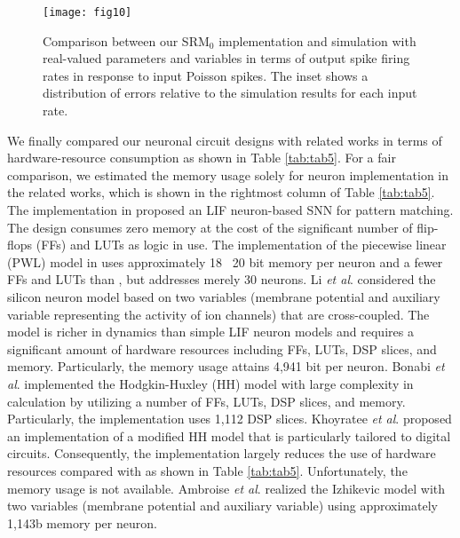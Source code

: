 \documentclass[10pt,journal]{IEEEtran}
\begin{document}
\begin{figure}[!b]\centering
    \texttt{[image: fig10]}
    \caption{\label{fig:fig10} Comparison between our SRM$_\textrm{0}$ implementation and simulation with real-valued parameters and variables in terms of output spike firing rates in response to input Poisson spikes. The inset shows a distribution of errors relative to the simulation results for each input rate.}
\end{figure}

We finally compared our neuronal circuit designs with related works in terms of hardware-resource consumption as shown in Table \ref{tab:tab5}. 
For a fair comparison, we estimated the memory usage solely for neuron implementation in the related works, which is shown in the rightmost column of Table \ref{tab:tab5}.
The implementation in \cite{caron2011fpga} proposed an LIF neuron-based SNN for pattern matching. 
The design consumes zero memory at the cost of the significant number of flip-flops (FFs) and LUTs as logic in use.
The implementation of the piecewise linear (PWL) model in \cite{soleimani2012biologically} uses approximately 18 \textendash~20 bit memory per neuron and a fewer FFs and LUTs than \cite{caron2011fpga}, but addresses merely 30 neurons.
Li \textit{et al}. \cite{li2012fpga} considered the silicon neuron model based on two variables (membrane potential and auxiliary variable representing the activity of ion channels) that are cross-coupled. 
The model is richer in dynamics than simple LIF neuron models and requires a significant amount of hardware resources including FFs, LUTs, DSP slices, and memory. 
Particularly, the memory usage attains 4,941 bit per neuron. 
Bonabi \textit{et al}. \cite{bonabi2014fpga} implemented the Hodgkin-Huxley (HH) model with large complexity in calculation by utilizing a number of FFs, LUTs, DSP slices, and memory. 
Particularly, the implementation uses 1,112 DSP slices.
Khoyratee \textit{et al}. \cite{khoyratee2019optimized} proposed an implementation of a modified HH model that is particularly tailored to digital circuits. 
Consequently, the implementation largely reduces the use of hardware resources compared with \cite{bonabi2014fpga} as shown in Table \ref{tab:tab5}.
Unfortunately, the memory usage is not available. 
Ambroise \textit{et al}. \cite{ambroise2013biorealistic} realized the Izhikevic model with two variables (membrane potential and auxiliary variable) using approximately 1,143b memory per neuron.
\end{document}
